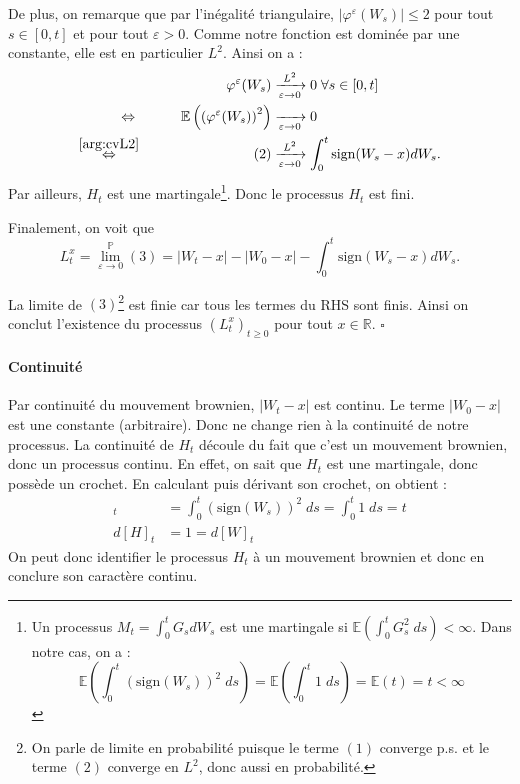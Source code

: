 \documentclass[openany]{book}
\makeatletter
\renewcommand{\P}{\mathds{P}}
\newcommand{\R}{\mathbb{R}}
\newcommand{\E}{\mathbb{E}}
\newcommand{\1}{\mathbbm{1}}
\newcommand{\sign}{\text{sign}}
\renewenvironment{proof}[1][\textbf{\textit{Démonstration}}]{%
  \par\pushQED{\qed}%
  \normalfont\topsep6\p@\@plus6\p@\relax
  \trivlist\item[\hskip\labelsep
    #1\@addpunct{.}]\ignorespaces
}{%
  \popQED\endtrivlist\@endpefalse
}
\theoremstyle{thmfont}
\theoremstyle{deffont}
\theoremstyle{thmfont}
\theoremstyle{deffont}
\makeatother
\begin{document}
\begin{proof}
\noindent De plus, on remarque que par l'inégalité triangulaire,
$|\varphi^\varepsilon(W_s)| \leq 2$ pour tout $s \in[0,t]$ et pour tout $\varepsilon > 0$. Comme notre fonction est dominée par une constante, elle est en particulier $L^2$. Ainsi on a :
\begin{alignat*}{2}
&& \varphi^\varepsilon(W_s) &\xrightarrow[\varepsilon \to 0]{L^2} 0 \; \forall s \in [0,t]\\
\Leftrightarrow\;&&\qquad \E\left(\left(\varphi^\varepsilon(W_s)\right)^2\right) &\xrightarrow[\varepsilon\to0]{} 0\\
\overset{\eqref{arg:cvL2}}{\Leftrightarrow}&&\qquad(2) &\xrightarrow[\varepsilon \to 0]{L^2} \int_0^t \sign(W_s -x) dW_s.
\end{alignat*}
Par ailleurs, $H_t$ est une martingale\footnote{Un processus $M_t = \int_0^t G_s dW_s$ est une martingale si $\E(\int_0^t G_s^2 \; ds)<\infty$. Dans notre cas, on a : $$\E\left(\int_0^t\left(\sign(W_s)\right)^2 \; ds\right) = \E\left(\int_0^t1 \; ds\right) = \E(t) = t < \infty$$}. Donc le processus $H_t$ est fini.

\noindent Finalement, on voit que
\begin{equation}
  L_t^x = \lim_{\varepsilon \to 0}^{\P}(3) = |W_t-x| - |W_0 - x| -  \int_0^t\sign(W_s -x)dW_s.
  \label{eq:exprTempsLoc}
\end{equation}

\noindent La limite de $(3)$\footnote{On parle de limite en probabilité puisque le terme $(1)$ converge p.s. et le terme $(2)$ converge en $L^2$, donc aussi en probabilité.} est finie car tous les termes du RHS sont finis. Ainsi on conclut l'existence du processus $(L_t^x)_{t\geq0}$ pour tout $x \in \R$. \hfill $\square$

\paragraph{Continuité} Par continuité du mouvement brownien, $|W_t - x|$ est continu. Le terme $|W_0 - x|$ est une constante (arbitraire). Donc ne change rien à la continuité de notre processus. La continuité de $H_t$ découle du fait que c'est un mouvement brownien, donc un processus continu. En effet, on sait que $H_t$ est une martingale, donc possède un crochet. En calculant puis dérivant son crochet, on obtient :
\begin{align*}
  [H]_t &= \int_0^t (\sign(W_s))^2 \; ds  = \int_0^t 1 \; ds = t\\
  d[H]_t &= 1 = d[W]_t
\end{align*}
On peut donc identifier le processus $H_t$ à un mouvement brownien et donc en conclure son caractère continu.  


\end{proof}
\end{document}
